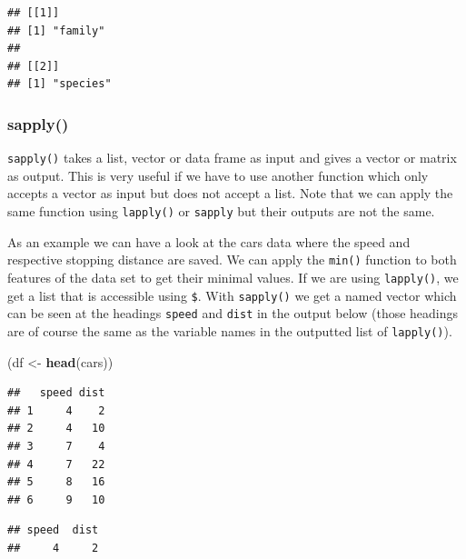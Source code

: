 \documentclass[
]{book}
\newenvironment{Shaded}{\begin{snugshade}}{\end{snugshade}}
\newcommand{\KeywordTok}[1]{\textcolor[rgb]{0.13,0.29,0.53}{\textbf{#1}}}
\newcommand{\NormalTok}[1]{#1}
\newcommand{\OperatorTok}[1]{\textcolor[rgb]{0.81,0.36,0.00}{\textbf{#1}}}
\newcommand{\StringTok}[1]{\textcolor[rgb]{0.31,0.60,0.02}{#1}}
\begin{document}
\begin{verbatim}
## [[1]]
## [1] "family"
## 
## [[2]]
## [1] "species"
\end{verbatim}

\hypertarget{sapply}{%
\subsubsection*{sapply()}\label{sapply}}

\texttt{sapply()} takes a list, vector or data frame as input and gives a vector or matrix as output. This is very useful if we have to use another function which only accepts a vector as input but does not accept a list. Note that we can apply the same function using \texttt{lapply()} or \texttt{sapply} but their outputs are not the same.

As an example we can have a look at the cars data where the speed and respective stopping distance are saved. We can apply the \texttt{min()} function to both features of the data set to get their minimal values. If we are using \texttt{lapply()}, we get a list that is accessible using \texttt{\$}. With \texttt{sapply()} we get a named vector which can be seen at the headings \texttt{speed} and \texttt{dist} in the output below (those headings are of course the same as the variable names in the outputted list of \texttt{lapply()}).

\begin{Shaded}
\begin{Highlighting}[]
\NormalTok{(df <-}\StringTok{ }\KeywordTok{head}\NormalTok{(cars))}
\end{Highlighting}
\end{Shaded}

\begin{verbatim}
##   speed dist
## 1     4    2
## 2     4   10
## 3     7    4
## 4     7   22
## 5     8   16
## 6     9   10
\end{verbatim}

\begin{Shaded}
\end{Shaded}

\begin{verbatim}
## speed  dist 
##     4     2
\end{verbatim}
\end{document}
